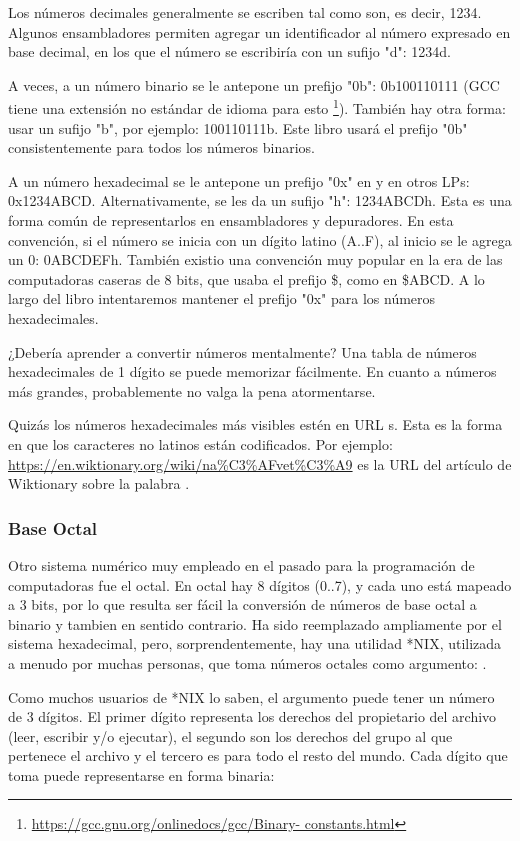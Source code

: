 Los números decimales generalmente se escriben tal como son, es decir, 1234. Algunos ensambladores permiten agregar un identificador al número expresado en base decimal, en los que el número se escribiría con un sufijo "d": 1234d.

A veces, a un número binario se le antepone un prefijo "0b": 0b100110111 (\ac{GCC} tiene una extensión no estándar de idioma para esto \footnote {\url {https://gcc.gnu.org/onlinedocs/gcc/Binary- constants.html}}).
También hay otra forma: usar un sufijo "b", por ejemplo: 100110111b.
Este libro usará el prefijo "0b" consistentemente para todos los números binarios.

A un número hexadecimal se le antepone un prefijo "0x" en \CCpp y en otros \ac{LP}s: 0x1234ABCD.
Alternativamente, se les da un sufijo "h": 1234ABCDh. Esta es una forma común de representarlos en ensambladores y depuradores.
En esta convención, si el número se inicia con un dígito latino (A..F), al inicio se le agrega un 0: 0ABCDEFh.
También existio una convención muy  popular en la era de las computadoras caseras de 8 bits, que usaba el prefijo \$, como en \$ABCD.
A lo largo del libro intentaremos mantener el prefijo "0x" para los números hexadecimales.

¿Debería aprender a convertir números mentalmente? Una tabla de números hexadecimales de 1 dígito se puede memorizar fácilmente.
En cuanto a números más grandes, probablemente no valga la pena atormentarse.

Quizás los números hexadecimales más visibles estén en \ac {URL} s.
Esta es la forma en que los caracteres no latinos están codificados.
Por ejemplo:
\url{https://en.wiktionary.org/wiki/na\%C3\%AFvet\%C3\%A9} es la \ac{URL} del artículo de Wiktionary sobre la palabra .

\subsubsection{Base Octal}

Otro sistema numérico muy empleado en el pasado para la programación de computadoras fue el octal. En octal hay 8 dígitos (0..7), y cada uno está mapeado a 3 bits, por lo que resulta ser fácil la conversión de números de base octal a binario y tambien en sentido contrario.
Ha sido reemplazado ampliamente por el sistema hexadecimal, pero, sorprendentemente, hay una utilidad *NIX, utilizada a menudo por muchas personas, que toma números octales como argumento: .

Como muchos usuarios de *NIX lo saben, el argumento  puede tener un número de 3 dígitos. El primer dígito representa los derechos del propietario del archivo (leer, escribir y/o ejecutar), el segundo son los derechos del grupo al que pertenece el archivo y el tercero es para todo el resto del mundo.
Cada dígito que  toma puede representarse en forma binaria:


